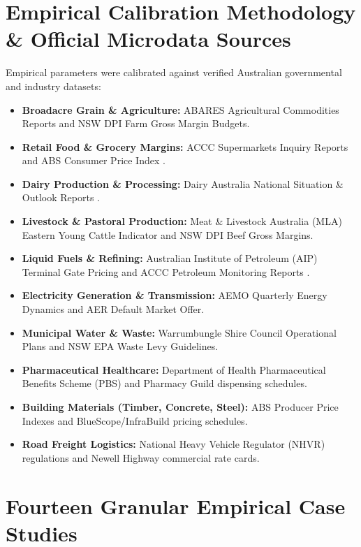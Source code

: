\documentclass[preprint,12pt,authoryear]{elsarticle}
\begin{document}
\section{Empirical Calibration Methodology \& Official Microdata Sources}
Empirical parameters were calibrated against verified Australian governmental and industry datasets:
\begin{itemize}
    \item \textbf{Broadacre Grain \& Agriculture:} ABARES Agricultural Commodities Reports \citep{abares2024crop} and NSW DPI Farm Gross Margin Budgets.
    \item \textbf{Retail Food \& Grocery Margins:} ACCC Supermarkets Inquiry Reports \citep{accc2024supermarkets} and ABS Consumer Price Index \citep{abs2024cpi}.
    \item \textbf{Dairy Production \& Processing:} Dairy Australia National Situation \& Outlook Reports \citep{dairyaus2024situation}.
    \item \textbf{Livestock \& Pastoral Production:} Meat \& Livestock Australia (MLA) Eastern Young Cattle Indicator and NSW DPI Beef Gross Margins.
    \item \textbf{Liquid Fuels \& Refining:} Australian Institute of Petroleum (AIP) Terminal Gate Pricing and ACCC Petroleum Monitoring Reports \citep{accc2025petroleum}.
    \item \textbf{Electricity Generation \& Transmission:} AEMO Quarterly Energy Dynamics \citep{aemo2025qed} and AER Default Market Offer.
    \item \textbf{Municipal Water \& Waste:} Warrumbungle Shire Council Operational Plans \citep{warrumbungle2025plan} and NSW EPA Waste Levy Guidelines.
    \item \textbf{Pharmaceutical Healthcare:} Department of Health Pharmaceutical Benefits Scheme (PBS) and Pharmacy Guild dispensing schedules.
    \item \textbf{Building Materials (Timber, Concrete, Steel):} ABS Producer Price Indexes \citep{abs2024ppi} and BlueScope/InfraBuild pricing schedules.
    \item \textbf{Road Freight Logistics:} National Heavy Vehicle Regulator (NHVR) regulations \citep{nhvr2024hvnl} and Newell Highway commercial rate cards.
\end{itemize}

\section{Fourteen Granular Empirical Case Studies}
\end{document}
